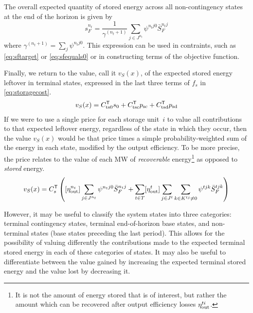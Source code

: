 \documentclass[12pt]{article}
\newcommand{\trans}[1]{#1^{\ensuremath{\mathsf{T}}}}    %
\numberwithin{equation}{section}
\numberwithin{table}{section}
\numberwithin{figure}{section}
\begin{document}
The overall expected quantity of stored energy across all non-contingency states at the end of the horizon is given by
\begin{equation}
s_F^{n_t} = \frac{1}{\gamma^{(n_t+1)}} \sum_{j \in J^{n_t}} \psi^{n_tj0} \bar{S}_F^{n_tj} \label{eq:sfend}
\end{equation}
where $\gamma^{(n_t+1)} = \sum_j \psi^{n_tj0}$. This expression can be used in contraints, such as \eqref{eq:sftarget} or \eqref{eq:sfequals0} or in constructing terms of the objective function.

Finally, we return to the value, call it $v_S(x)$, of the expected stored energy leftover in terminal states, expressed in the last three terms of $f_s$ in \eqref{eq:storagecost}.
\begin{equation}
v_S(x) = \trans{C_{\rm ts0}} s_0 + \trans{C_{\rm tsc}} p_{\rm sc} + \trans{C_{\rm tsd}} p_{\rm sd}
\end{equation}
If we were to use a single price for each storage unit~$i$ to value all contributions to that expected leftover energy, regardless of the state in which they occur, then the value $v_S(x)$ would be that price times a simple probability-weighted sum of the energy in each state, modified by the output efficiency. To be more precise, the price relates to the value of each MW of \emph{recoverable} energy\footnote{It is not the amount of energy stored that is of interest, but rather the amount which can be recovered after output efficiency losses $\eta^{ti}_{\rm out}$.} as opposed to \emph{stored} energy.
\begin{align}
v_S(x) = \trans{C_s} \left( [\eta^{n_t}_{\rm out}] \sum_{j \in J^{n_t}} \psi^{n_tj0} \bar{S}_F^{n_tj} + \sum_{t \in T} [\eta^{t}_{\rm out}] \sum_{j \in J^t} \sum_{k \in K^{tj} \ne 0} \psi^{tjk}  \bar{S}_F^{tjk} \right) \label{eq:singleprice}
\end{align}

However, it may be useful to classify the system states into three categories: terminal contingency states, terminal end-of-horizon base states, and non-terminal states (base states preceding the last period). This allows for the possibility of valuing differently the contributions made to the expected terminal stored energy in each of these categories of states. It may also be useful to differentiate between the value gained by increasing the expected terminal stored energy and the value lost by decreasing it.
\end{document}
